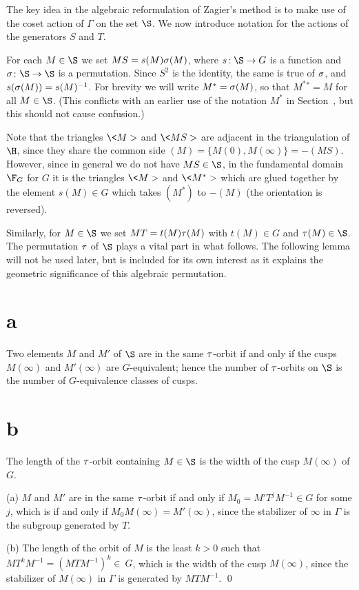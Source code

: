 The key idea in the algebraic reformulation of Zagier's method is to
make use of the coset action of $\Gamma$ on the set $\S$.  We now
introduce notation for the actions of the generators $S$ and $T$.

\endsubsubhead
For each $M\in\S$ we set $MS=s(M)\sigma(M)$, where $s\colon\S\to G$
is a function and $\s\colon\S\to\S$ is a permutation.  Since $S^2$ is
the identity, the same is true of $\sigma$, and $s(\sigma(M))=s(M)^{-1}$.
For brevity we will write $M^*=\sigma(M)$, so that $M^*{}^*=M$ for all
$M\in\S$.   (This conflicts with an earlier use of the notation $M^*$
in Section~\Homol, but this should not cause confusion.)

Note that the triangles $\<M>$ and $\<MS>$ are adjacent in the
triangulation of $\H$, since they share the common side
$(M)=\{M(0),M(\infty)\} = -(MS)$.  However, since in general we do not
have $MS\in\S$, in the fundamental domain $\F_{G}$ for $G$ it is the
triangles $\<M>$ and $\<M^*>$ which are glued together by the element
$s(M)\in G$ which takes $(M^*)$ to $-(M)$ (the orientation is
reversed).

\endsubsubhead
Similarly, for $M\in\S$ we set $MT=t(M)\tau(M)$ with $t(M)\in G$ and
$\t(M)\in\S$.  The permutation $\tau$ of $\S$ plays a vital part in what
follows.  The following lemma will not be used
later, but is included for its own interest as it explains the
geometric significance of this algebraic permutation.

\part{a} Two elements $M$ and $M'$ of $\S$ are in the
same $\tau$-orbit if and only if the cusps $M(\infty)$ and $M'(\infty)$
are $G$-equivalent; hence the number of $\tau$-orbits on $\S$ is the
number of $G$-equivalence classes of cusps.
\part{b} The length of the $\tau$-orbit containing $M\in\S$ is the width
of the cusp $M(\infty)$ of $G$.
\endproclaim

 (a) $M$ and $M'$ are in the same $\tau$-orbit if and
only if $M_0 = M'T^jM^{-1} \in G$ for some $j$, which is if and only
if $M_0M(\infty)=M'(\infty)$, since the stabilizer of $\infty$ in
$\Gamma$ is the subgroup generated by $T$.

(b) The length of the orbit of $M$ is the least $k>0$ such that
$MT^kM^{-1} = \left(M TM^{-1}\right)^k \in\ G$, which is the width of
the cusp $M(\infty)$, since the stabilizer of $M(\infty)$ in $\Gamma$
is generated by $M TM^{-1}$.
\qed\enddemo


